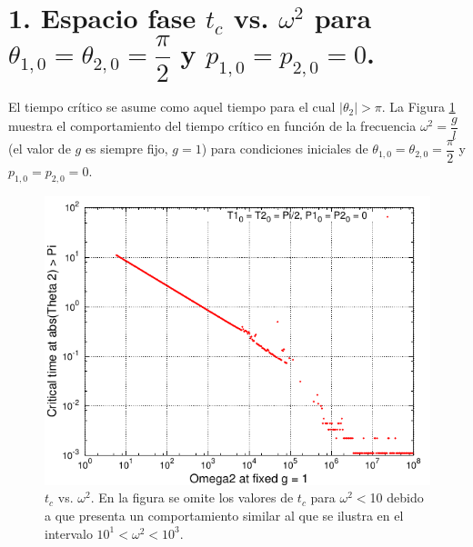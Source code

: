 \documentclass[10pt,letterpaper]{article}
\begin{document}
\section*{1. Espacio fase $t_c$ vs. $\omega^2$ para $\theta_{1,0} = \theta_{2,0}= \dfrac{\pi}{2}$ y $p_{1,0} = p_{2,0}=0$.}
El tiempo crítico se asume como aquel tiempo para el cual $|\theta_2| >\pi$. La Figura \ref{PhaseSpace1D} muestra el comportamiento del tiempo crítico en función de la frecuencia $\omega^2 = \dfrac{g}{l}$ (el valor de $g$ es siempre fijo, $g=1$) para condiciones iniciales de $\theta_{1,0} = \theta_{2,0} = \dfrac{\pi}{2}$  y $p_{1,0} = p_{2,0} = 0$. 
\begin{figure}
\centering
\includegraphics[scale=1]{Grafica_TCritico_L.pdf}
\caption{$t_c$ vs. $\omega^2$. En la figura se omite los valores de $t_c$ para $\omega^2 <$10 debido a que presenta un comportamiento similar al que se ilustra en el intervalo $10^1 < \omega^2 < 10^3$.}\label{PhaseSpace1D}
\end{figure}
\end{document}
